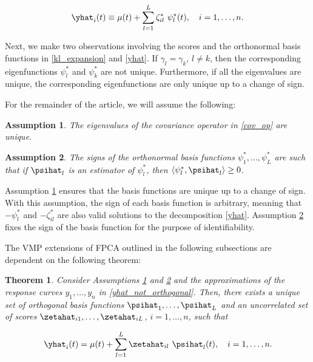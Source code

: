 \documentclass[12pt]{article}
\theoremstyle{plain}
\newtheorem{theorem}{Theorem}[section]
\newtheorem{assumption}{Assumption}
\theoremstyle{definition}
\theoremstyle{remark}
\begin{document}
\begin{equation}
	\yhat_i (t) \equiv \mu (t) + \sum_{l=1}^L \zeta^*_{il} \ \psi^*_l (t), \quad i = 1, \dots, n.
\label{yhat}
\end{equation}

Next, we make two observations involving the scores and the orthonormal basis functions in \eqref{kl_expansion}
and \eqref{yhat}.
If $\gamma_l = \gamma_k$, $l \neq k$, then the corresponding eigenfunctions $\psi^*_l$ and $\psi^*_k$ are not
unique. Furthermore, if all the eigenvalues are unique, the corresponding eigenfunctions are only unique up to
a change of sign.

For the remainder of the article, we will assume the following:

\begin{assumption}
	
	The eigenvalues of the covariance operator in \eqref{cov_op} are unique.
	
\label{asspn:scores}
\end{assumption}

\begin{assumption}
	
	The signs of the orthonormal basis functions $\psi^*_1, \dots, \psi^*_L$ are such that if $\psihat_l$ is an
	estimator of $\psi^*_l$, then $\langle \psi^*_l , \psihat_l \rangle \ge 0$.
	
\label{asspn:signs}
\end{assumption}

\noindent Assumption \ref{asspn:scores} ensures that the basis functions are unique up to a change of sign.
With this assumption, the sign of each basis function is arbitrary, meaning that $-\psi^*_l$ and $-\zeta^*_{il}$
are also valid solutions to the decomposition \eqref{yhat}. Assumption \ref{asspn:signs} fixes the sign of
the basis function for the purpose of identifiability.

The VMP extensions of FPCA outlined in the following subsections are dependent on the following theorem:

\begin{theorem}
	
	Consider Assumptions \ref{asspn:scores} and \ref{asspn:signs} and the approximations of the response
	curves $y_1, \dots, y_n$ in \eqref{yhat_not_orthogonal}. Then, there exists a unique set of orthogonal basis
	functions $\psihat_1, \dots, \psihat_L$ and an uncorrelated set of scores $\zetahat_{i1}, \dots, \zetahat_{iL}$,
	$i = 1, \dots, n$, such that
	
	\[
		\yhat_i (t) = \mu (t) + \sum_{l=1}^L \zetahat_{il} \ \psihat_l (t), \quad i = 1, \dots, n.
	\]
	
\label{thm:orth_basis}
\end{theorem}
\end{document}
